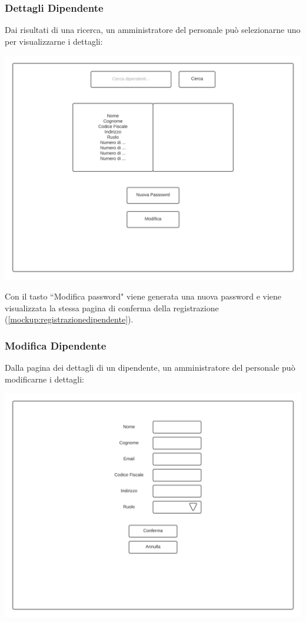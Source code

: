 \documentclass[12pt]{article}
\begin{document}
\newpage

\subsubsection{Dettagli Dipendente}
Dai risultati di una ricerca, un amministratore del personale può selezionarne uno per visualizzarne i dettagli:

\begin{center}
\includegraphics[height=0.3\textheight]{Mockup/AmministratorePersonale/Dettagli}
\end{center}

Con il tasto ``Modifica password" viene generata una nuova password e viene visualizzata la stessa pagina di conferma della registrazione (\ref{mockup:registrazionedipendente}).


\subsubsection{Modifica Dipendente}
Dalla pagina dei dettagli di un dipendente, un amministratore del personale può modificarne i dettagli:

\begin{center}
\includegraphics[height=0.3\textheight]{Mockup/AmministratorePersonale/Registrazione}
\end{center}

\newpage



\newpage

\end{document}
